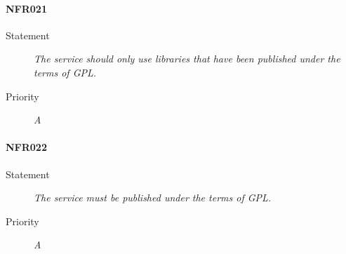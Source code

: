 \paragraph{NFR021}
\begin{description}
  \item [Statement] 
    \textit{The service should only use libraries that have been published under the terms of \gls{GPL}.}
  \item [Priority] \textit{A}
\end{description}

\paragraph{NFR022}
\begin{description}
  \item [Statement] 
    \textit{The service must be published under the terms of \gls{GPL}.}
  \item [Priority] \textit{A}
\end{description}
